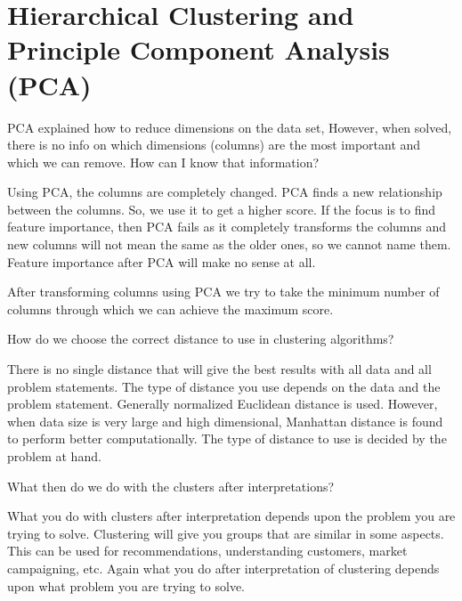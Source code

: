 	\section{Hierarchical Clustering and Principle Component Analysis (PCA)}
	\resetquestioncounter{}
	\begin{qanda}
		\begin{question}
PCA explained how to reduce dimensions on the data set, However, when solved, there is no info on which dimensions (columns) are the most important and which we can remove. How can I know that information?
		\end{question}
		\begin{answer}
Using PCA, the columns are completely changed. PCA finds a new relationship between the columns. So, we use it to get a higher score. If the focus is to find feature importance, then PCA fails as it completely transforms the columns and new columns will not mean the same as the older ones, so we cannot name them. Feature importance after PCA will make no sense at all.

After transforming columns using PCA we try to take the minimum number of columns through which we can achieve the maximum score.
		\end{answer}
	\end{qanda}


	\begin{qanda}
		\begin{question}
How do we choose the correct distance to use in clustering algorithms?
		\end{question}
		\begin{answer}
There is no single distance that will give the best results with all data and all problem statements. The type of distance you use depends on the data and the problem statement. Generally normalized Euclidean distance is used. However, when data size is very large and high dimensional, Manhattan distance is found to perform better computationally. The type of distance to use is decided by the problem at hand.
		\end{answer}
	\end{qanda}


	\begin{qanda}
		\begin{question}
What then do we do with the clusters after interpretations?
		\end{question}
		\begin{answer}
What you do with clusters after interpretation depends upon the problem you are trying to solve. Clustering will give you groups that are similar in some aspects. This can be used for recommendations, understanding customers, market campaigning, etc. Again what you do after interpretation of clustering depends upon what problem you are trying to solve.
		\end{answer}
	\end{qanda}


